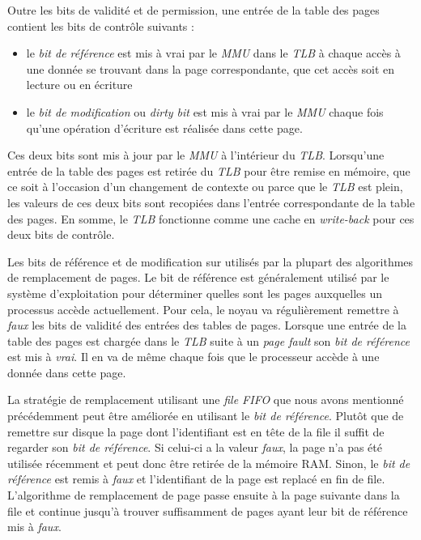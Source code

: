 Outre les bits de validité et de permission, une entrée de la table des
pages contient les bits de contrôle suivants :

\begin{itemize}
    \item le \textit{bit de référence} est mis à vrai par le
        \textit{MMU} dans le \textit{TLB} à chaque accès à une donnée se
        trouvant dans la page correspondante, que cet accès soit en
        lecture ou en écriture
    \item le \textit{bit de modification} ou \textit{dirty bit} est mis
        à vrai par le \textit{MMU} chaque fois qu'une opération
        d'écriture est réalisée dans cette page.
\end{itemize}

Ces deux bits sont mis à jour par le \textit{MMU} à l'intérieur du
\textit{TLB}. Lorsqu'une entrée de la table des pages est retirée du
\textit{TLB} pour être remise en mémoire, que ce soit à l'occasion d'un
changement de contexte ou parce que le \textit{TLB} est plein, les
valeurs de ces deux bits sont recopiées dans l'entrée correspondante
de la table des pages. En somme, le \textit{TLB} fonctionne comme une
cache en \textit{write-back} pour ces deux bits de contrôle.\newline
  
Les bits de référence et de modification sur utilisés par la plupart
des algorithmes de remplacement de pages. Le bit de référence est
généralement utilisé par le système d'exploitation pour déterminer
quelles sont les pages auxquelles un processus accède actuellement.
Pour cela, le noyau va régulièrement remettre à \textit{faux} les bits
de validité des entrées des tables de pages. Lorsque une entrée de la
table des pages est chargée dans le \textit{TLB} suite à un
\textit{page fault} son \textit{bit de référence} est mis à
\textit{vrai}. Il en va de même chaque fois que le processeur accède à
une donnée dans cette page. \newline
  
La stratégie de remplacement utilisant une \textit{file FIFO} que
nous avons mentionné précédemment peut être améliorée en utilisant le
\textit{bit de référence}. Plutôt que de remettre sur disque la page
dont l'identifiant est en tête de la file il suffit de regarder son
\textit{bit de référence}. Si celui-ci a la valeur \textit{faux}, la page n'a pas été utilisée récemment et peut
donc être retirée de la mémoire RAM. Sinon, le \textit{bit de référence}
est remis à \textit{faux} et l'identifiant de la page est
replacé en fin de file. L'algorithme de remplacement de page passe
ensuite à la page suivante dans la file et continue jusqu'à trouver
suffisamment de pages ayant leur bit de référence mis à
\textit{faux}.\newline
  
